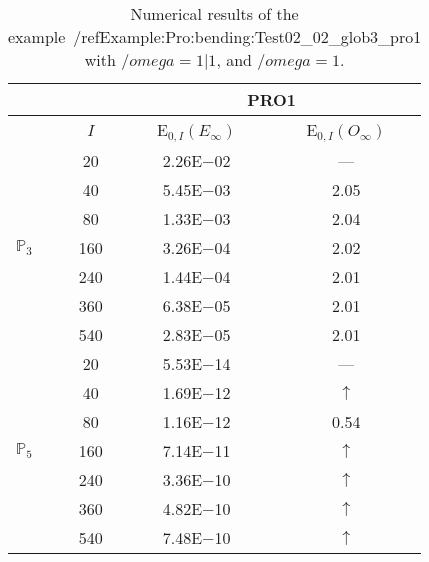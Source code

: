 \begin{table}[H]
\caption{Numerical results of the example~/ref{Example:Pro:bending:Test02_02_glob3_pro1} with $/omega=1|1$, and $/omega=1$.}
\setlength{\tabcolsep}{5pt}
\centering
\begin{tabular}{@{}l c c c@{}}
\toprule
 &  & \multicolumn{2}{c}{PRO1}\\
\midrule
 & $I$ & E$_{0,I}(E_{\infty})$ & E$_{0,I}(O_{\infty})$\\
\midrule
\multirow{7}{*}{$\mathbb{P}_{3}$}
 & 20 & 2.26E$-$02 & ---\\
 & 40 & 5.45E$-$03 & 2.05\\
 & 80 & 1.33E$-$03 & 2.04\\
 & 160 & 3.26E$-$04 & 2.02\\
 & 240 & 1.44E$-$04 & 2.01\\
 & 360 & 6.38E$-$05 & 2.01\\
 & 540 & 2.83E$-$05 & 2.01\\
\midrule
\multirow{7}{*}{$\mathbb{P}_{5}$}
 & 20 & 5.53E$-$14 & ---\\
 & 40 & 1.69E$-$12 & $\uparrow$\\
 & 80 & 1.16E$-$12 & 0.54\\
 & 160 & 7.14E$-$11 & $\uparrow$\\
 & 240 & 3.36E$-$10 & $\uparrow$\\
 & 360 & 4.82E$-$10 & $\uparrow$\\
 & 540 & 7.48E$-$10 & $\uparrow$\\
\bottomrule
\end{tabular}
\label{Table:PRO:test_02_02_test9_pro1}
\end{table}
